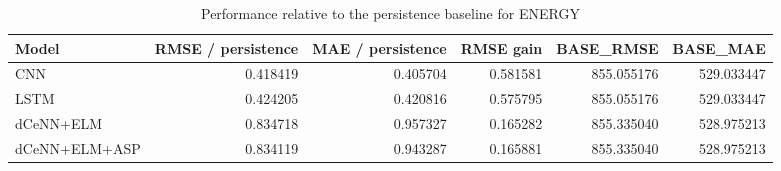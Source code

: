 \begin{table}
\caption{Performance relative to the persistence baseline for ENERGY}
\begin{tabular}{lrrrrr}
\toprule
Model & RMSE / persistence & MAE / persistence & RMSE gain & BASE\_RMSE & BASE\_MAE \\
\midrule
CNN & 0.418419 & 0.405704 & 0.581581 & 855.055176 & 529.033447 \\
LSTM & 0.424205 & 0.420816 & 0.575795 & 855.055176 & 529.033447 \\
dCeNN+ELM & 0.834718 & 0.957327 & 0.165282 & 855.335040 & 528.975213 \\
dCeNN+ELM+ASP & 0.834119 & 0.943287 & 0.165881 & 855.335040 & 528.975213 \\
\bottomrule
\end{tabular}
\end{table}
